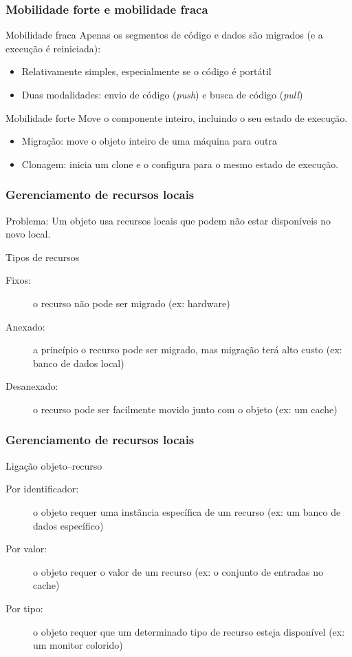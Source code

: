 \documentclass[Ligatures=TeX,table,brazil,svgnames,usetotalslideindicator,compress,10pt]{beamer}
\begin{document}
\begin{frame}
  \frametitle{Mobilidade forte e mobilidade fraca}
  \begin{block}{Mobilidade fraca}
    Apenas os segmentos de código e dados são migrados (e a execução é reiniciada):
    \begin{itemize}
    \item Relativamente simples, especialmente se o código é portátil
    \item Duas modalidades: \alert{envio de código} (\textit{push}) e \alert{busca de código} (\textit{pull})
    \end{itemize}
  \end{block}

  \begin{block}{Mobilidade forte}
    Move o componente inteiro, incluindo o seu estado de execução.
    \begin{itemize}
    \item \alert{Migração:} move o objeto inteiro de uma máquina para outra
    \item \alert{Clonagem:} inicia um clone e o configura para o mesmo estado de execução.
    \end{itemize}
  \end{block}
\end{frame}

\begin{frame}
  \frametitle{Gerenciamento de recursos locais}
  \begin{alertblock}{Problema:}
    Um objeto usa recursos locais que podem não estar disponíveis no novo local.
  \end{alertblock}

  \begin{block}{Tipos de recursos}
    \begin{description}
    \item[Fixos:] o recurso não pode ser migrado (ex: hardware)
    \item[Anexado:] a princípio o recurso pode ser migrado, mas migração terá alto custo (ex: banco de dados local)
    \item[Desanexado:] o recurso pode ser facilmente movido junto com o objeto (ex: um cache)
    \end{description}
  \end{block}
\end{frame}

\begin{frame}
  \frametitle{Gerenciamento de recursos locais}
  \begin{block}{Ligação objeto--recurso}
    \begin{description}
    \item[Por identificador:] o objeto requer uma instância específica de um recurso (ex: um banco de dados específico)
    \item[Por valor:] o objeto requer o valor de um recurso (ex: o conjunto de entradas no cache)
    \item[Por tipo:] o objeto requer que um determinado tipo de recurso esteja disponível (ex: um monitor colorido)
    \end{description}
  \end{block}
\end{frame}
\end{document}
